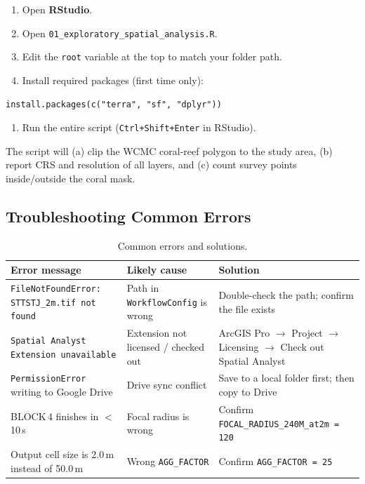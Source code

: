 \documentclass[11pt, a4paper]{article}
\begin{document}
\begin{enumerate}[noitemsep]
  \item Open \textbf{RStudio}.
  \item Open \texttt{01\_exploratory\_spatial\_analysis.R}.
  \item Edit the \texttt{root} variable at the top to match your folder path.
  \item Install required packages (first time only):
\end{enumerate}

\begin{lstlisting}[style=Rcode]
install.packages(c("terra", "sf", "dplyr"))
\end{lstlisting}

\begin{enumerate}
  \item Run the entire script (\texttt{Ctrl+Shift+Enter} in RStudio).
\end{enumerate}

The script will (a) clip the WCMC coral-reef polygon to the study area,
(b) report CRS and resolution of all layers, and (c) count survey points
inside/outside the coral mask.

\subsection{Troubleshooting Common Errors}

\begin{table}[h]
\centering
\caption{Common errors and solutions.}
\begin{tabularx}{\linewidth}{L{5cm}L{4.5cm}X}
\toprule
\textbf{Error message} & \textbf{Likely cause} & \textbf{Solution} \\
\midrule
\texttt{FileNotFoundError: STTSTJ\_2m.tif not found}
  & Path in \texttt{WorkflowConfig} is wrong
  & Double-check the path; confirm the file exists \\
\texttt{Spatial Analyst Extension unavailable}
  & Extension not licensed / checked out
  & ArcGIS Pro $\to$ Project $\to$ Licensing $\to$ Check out Spatial Analyst \\
\texttt{PermissionError} writing to Google Drive
  & Drive sync conflict
  & Save to a local folder first; then copy to Drive \\
BLOCK\,4 finishes in $<$10\,s
  & Focal radius is wrong
  & Confirm \texttt{FOCAL\_RADIUS\_240M\_at2m = 120} \\
Output cell size is 2.0\,m instead of 50.0\,m
  & Wrong \texttt{AGG\_FACTOR}
  & Confirm \texttt{AGG\_FACTOR = 25} \\
\bottomrule
\end{tabularx}
\end{table}
\end{document}
